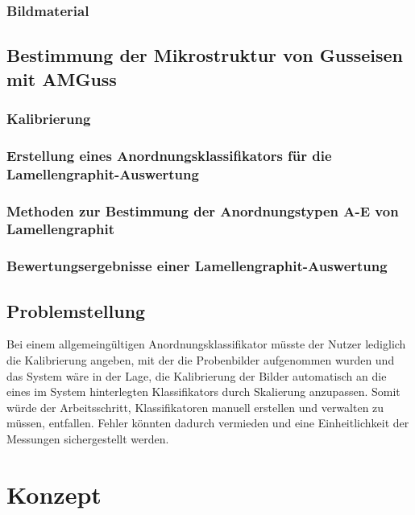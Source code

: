 \documentclass[
fontsize=10pt, 
listof = totoc,
parskip = half	
]{report}
\begin{document}
\subsection{Bildmaterial}
\label{subsec:Bildmaterial}

\section{Bestimmung der Mikrostruktur von Gusseisen mit AMGuss}
\label{sec:BestimmungMikrostrukturAMGuss}

\subsection{Kalibrierung}
\label{subsec:Kalibrierung}

\subsection{Erstellung eines Anordnungsklassifikators für die Lamellengraphit-Auswertung}
\label{subsec: ErstellungAnordnungsklassifAMGuss}

\subsection{Methoden zur Bestimmung der Anordnungstypen A-E von Lamellengraphit}
\label{subsec:AnordnungstypenLamellengraphit}

\subsection{Bewertungsergebnisse einer Lamellengraphit-Auswertung}
\label{subsec:ErgebnisseAMGuss}

\section{Problemstellung}
\label{sec:Problemstellung}

Bei einem allgemeingültigen Anordnungsklassifikator müsste der Nutzer lediglich die Kalibrierung angeben, mit der die Probenbilder aufgenommen wurden und das System wäre in der Lage, die Kalibrierung der Bilder automatisch an die eines im System hinterlegten Klassifikators durch Skalierung anzupassen. Somit würde der Arbeitsschritt, Klassifikatoren manuell erstellen und  verwalten zu müssen, entfallen. Fehler könnten dadurch vermieden und eine Einheitlichkeit der Messungen sichergestellt werden.

\chapter{Konzept}
\label{ch:Konzept}
\end{document}
